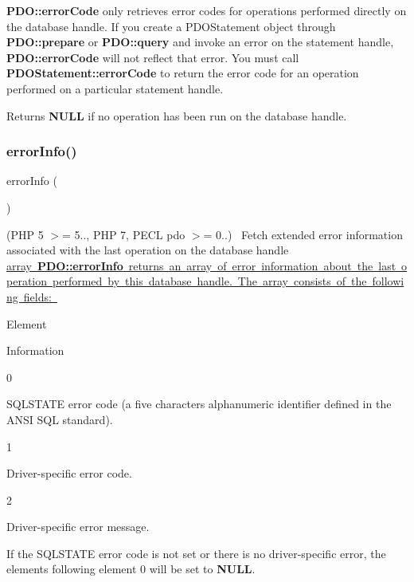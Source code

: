 {\bfseries P\+D\+O\+::error\+Code} only retrieves error codes for operations performed directly on the database handle. If you create a P\+D\+O\+Statement object through {\bfseries P\+D\+O\+::prepare} or {\bfseries P\+D\+O\+::query} and invoke an error on the statement handle, {\bfseries P\+D\+O\+::error\+Code} will not reflect that error. You must call {\bfseries P\+D\+O\+Statement\+::error\+Code} to return the error code for an operation performed on a particular statement handle. 

Returns {\bfseries N\+U\+LL} if no operation has been run on the database handle. \mbox{\label{interface_pes_1_1_database_1_1_handler_1_1_p_d_o_interface_ac5230ce6cd46c5e922146a441d807877}} 
\subsubsection{\texorpdfstring{error\+Info()}{errorInfo()}}
{\footnotesize\ttfamily error\+Info (\begin{DoxyParamCaption}{ }\end{DoxyParamCaption})}

(P\+HP 5 $>$= 5.., P\+HP 7, P\+E\+CL pdo $>$= 0..)~\newline
 Fetch extended error information associated with the last operation on the database handle \mbox{\hyperlink{}{array {\bfseries P\+D\+O\+::error\+Info} returns an array of error information about the last operation performed by this database handle. The array consists of the following fields\+: }} 

Element 

Information  

0 

S\+Q\+L\+S\+T\+A\+TE error code (a five characters alphanumeric identifier defined in the A\+N\+SI S\+QL standard).  

1 

Driver-\/specific error code.  

2 

Driver-\/specific error message.  

If the S\+Q\+L\+S\+T\+A\+TE error code is not set or there is no driver-\/specific error, the elements following element 0 will be set to {\bfseries N\+U\+LL}. 


